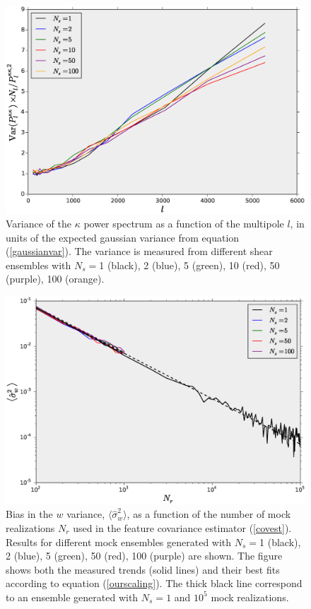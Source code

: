 \documentclass[reprint,aps,prd,superscriptaddress,showkeys,showpacs]{revtex4-1}
\newcommand{\h}[1]{\hat{#1}}
\begin{document}
\begin{figure}
\includegraphics[scale=0.3]{Figures/ps_variance.eps}
\caption{Variance of the $\kappa$ power spectrum as a function of the multipole $l$, in units of the expected gaussian variance from equation (\ref{gaussianvar}). The variance is measured from different shear ensembles with $N_s=$1 (black), 2 (blue), 5 (green), 10 (red), 50 (purple), 100 (orange). }
\label{ps_var}
\end{figure}

\begin{figure}
\includegraphics[scale=0.3]{Figures/scaling_nr.eps}
\caption{Bias in the $w$ variance, $\langle\h{\sigma}^2_w\rangle$, as a function of the number of mock realizations $N_r$ used in the feature covariance estimator (\ref{covest}). Results for different mock ensembles generated with $N_s=$1 (black), 2 (blue), 5 (green), 50 (red), 100 (purple) are shown. The figure shows both the measured trends (solid lines) and their best fits according to equation (\ref{ourscaling}). The thick black line correspond to an ensemble generated with $N_s=1$ and $10^5$ mock realizations. }
\label{wvar_nr}
\end{figure}
\end{document}
